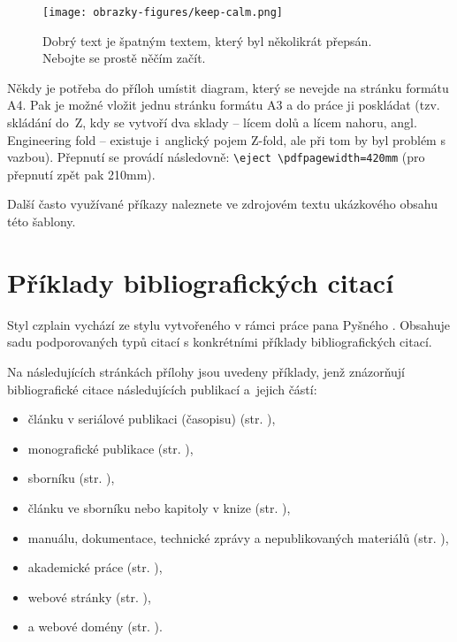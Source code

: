\begin{figure}[hbt]
	\centering
	\texttt{[image: obrazky-figures/keep-calm.png]}
	\caption{Dobrý text je špatným textem, který byl několikrát přepsán. Nebojte se prostě něčím začít.}
	\label{keepCalm}
\end{figure}

Někdy je potřeba do příloh umístit diagram, který se nevejde na stránku formátu A4. Pak je možné vložit jednu stránku formátu A3 a do práce ji poskládat (tzv. skládání do~Z, kdy se vytvoří dva sklady -- lícem dolů a lícem nahoru, angl. Engineering fold -- existuje i~anglický pojem Z-fold, ale při tom by byl problém s vazbou). Přepnutí se provádí následovně: \texttt{\textbackslash{}eject \textbackslash{}pdfpagewidth=420mm} (pro přepnutí zpět pak 210mm).

Další často využívané příkazy naleznete ve zdrojovém textu ukázkového obsahu této šablony.



\newcommand{\odradkovani}{\\[0.3em]}

\chapter{Příklady bibliografických citací}
\label{priloha-priklady-citaci}
Styl czplain vychází ze stylu vytvořeného v rámci práce pana Pyšného \cite{Pysny}. Obsahuje sadu podporovaných typů citací s konkrétními příklady bibliografických citací. 

Na následujících stránkách přílohy jsou uvedeny příklady, jenž znázorňují bibliografické citace následujících publikací a~jejich částí:
\begin{itemize}
   \item článku v seriálové publikaci (časopisu) (str. \pageref{pr-casopis-clanek}),
   \item monografické publikace (str. \pageref{pr-monografie}),
   \item sborníku (str. \pageref{pr-sbornik}),
   \item článku ve sborníku nebo kapitoly v knize (str. \pageref{pr-kapitola}),
   \item manuálu, dokumentace, technické zprávy a nepublikovaných materiálů (str. \pageref{pr-manual}),
   \item akademické práce (str. \pageref{pr-thesis}),
   \item webové stránky (str. \pageref{pr-webpage}),
   \item a webové domény (str. \pageref{pr-website}).
\end{itemize}

